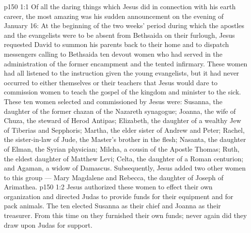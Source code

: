 \vs p150 1:1 Of all the daring things which Jesus did in connection with his earth career, the most amazing was his sudden announcement on the evening of January 16:  At the beginning of the two weeks’ period during which the apostles and the evangelists were to be absent from Bethsaida on their furlough, Jesus requested David to summon his parents back to their home and to dispatch messengers calling to Bethsaida ten devout women who had served in the administration of the former encampment and the tented infirmary. These women had all listened to the instruction given the young evangelists, but it had never occurred to either themselves or their teachers that Jesus would dare to commission women to teach the gospel of the kingdom and minister to the sick. These ten women selected and commissioned by Jesus were: Susanna, the daughter of the former chazan of the Nazareth synagogue; Joanna, the wife of Chuza, the steward of Herod Antipas; Elizabeth, the daughter of a wealthy Jew of Tiberias and Sepphoris; Martha, the elder sister of Andrew and Peter; Rachel, the sister\hyp{}in\hyp{}law of Jude, the Master’s brother in the flesh; Nasanta, the daughter of Elman, the Syrian physician; Milcha, a cousin of the Apostle Thomas; Ruth, the eldest daughter of Matthew Levi; Celta, the daughter of a Roman centurion; and Agaman, a widow of Damascus. Subsequently, Jesus added two other women to this group --- Mary Magdalene and Rebecca, the daughter of Joseph of Arimathea.
\vs p150 1:2 Jesus authorized these women to effect their own organization and directed Judas to provide funds for their equipment and for pack animals. The ten elected Susanna as their chief and Joanna as their treasurer. From this time on they furnished their own funds; never again did they draw upon Judas for support.

